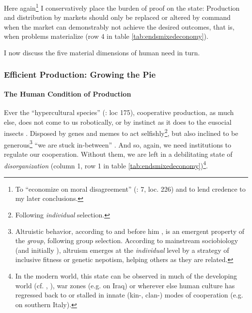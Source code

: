 Here again\footnote
	{To ``economize on moral disagreement'' (\citealt{GutmannThompson-2004-aa}: 7,  loc. 226) and to lend credence to my later conclusions.}
I conservatively place the burden of proof on the state: Production and distribution by markets should only be replaced or altered by command when the market can demonstrably not achieve the desired outcomes, that is, when problems materialize (row 4 in table \ref{tab:endsmixedeconomy}).

I now discuss the five material dimensions of human need in turn. 

\subsubsection[Efficient Production]{Efficient Production: Growing the Pie}\label{sec:production}

\paragraph{The Human Condition of Production} \label{sec:humanconditionofproduction}
Ever the ``hypercultural species'' (\citealt{Henrich2007}: loc 175), cooperative production, as much else, does not come to us robotically, or by instinct as it does to the eusocial insects \citep{Wilson2012}. Disposed by genes and memes to act selfishly\footnote
	{Following \emph{individual} selection.}, 
but also inclined to be generous\footnote
	{Altruistic behavior, according to \cite{Wilson2012} and before him \cite{Darwin1859}, is an emergent property of the \emph{group}, following group selection. According to mainstream sociobiology (and initially \citealt{Wilson1975}), altruism emerges at the \emph{individual} level by a strategy of inclusive fitness or genetic nepotism, helping others as they are related.} 
``we are stuck in-between'' \citep{Lehrer2012}. And so, again, we need institutions to regulate our cooperation. Without them, we are left in a debilitating state of \emph{disorganization} (column 1, row 1 in table \ref{tab:endsmixedeconomy})\footnote
	{In the modern world, this state can be observed in much of the developing world (cf. \citealt{Clark2007}, \citealt{Easterly-2006-aa}), war zones (e.g. \citealt{Baker-IIIHamilton-2006-aa} on Iraq) or wherever else human culture has regressed back to or stalled in innate (kin-, clan-) modes of cooperation (e.g. \citealt{PutnamLeonardi-1993-aa} on southern Italy).}.

